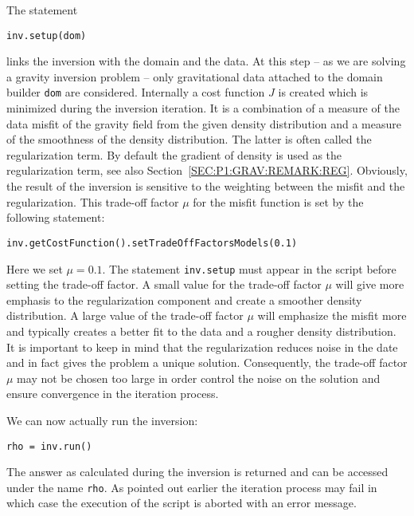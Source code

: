 The statement 
\begin{verbatim}
inv.setup(dom)
\end{verbatim}
links the inversion with the domain and the data.
At this step -- as we are solving a gravity inversion problem -- only
gravitational data attached to the domain builder \verb|dom| are considered.
Internally a cost function $J$ is created which is minimized during the
inversion iteration.
It is a combination of a measure of the data misfit of the gravity field from
the given density distribution and a measure of the smoothness of the density
distribution.
The latter is often called the regularization term.
By default the gradient of density is used as the regularization term, see
also Section~\ref{SEC:P1:GRAV:REMARK:REG}.
Obviously, the result of the inversion is sensitive to the weighting between
the misfit and the regularization.
This trade-off factor $\mu$ for the misfit function is set by the following
statement:
\begin{verbatim}
inv.getCostFunction().setTradeOffFactorsModels(0.1) 
\end{verbatim}
Here we set $\mu=0.1$. The statement \verb|inv.setup| must appear in the
script before setting the trade-off factor.
A small value for the trade-off factor $\mu$ will give more emphasis to the
regularization component and create a smoother density distribution.
A large value of the trade-off factor $\mu$ will emphasize the misfit more
and typically creates a better fit to the data and a rougher density
distribution.
It is important to keep in mind that the regularization reduces noise in the
date and in fact gives the problem a unique solution.
Consequently, the trade-off factor $\mu$ may not be chosen too large in order
control the noise on the solution and ensure convergence in the iteration
process.

We can now actually run the inversion:
\begin{verbatim}
rho = inv.run()
\end{verbatim}
The answer as calculated during the inversion is returned and can be accessed
under the name \verb|rho|.
As pointed out earlier the iteration process may fail in which case the
execution of the script is aborted with an error message.

